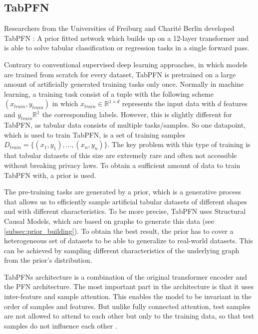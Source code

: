 \subsection{TabPFN}
Researchers from the Universities of Freiburg and Charité Berlin developed TabPFN \citep{hollmann2022tabpfn}: A prior fitted network which builds up on a 12-layer transformer and is able to solve tabular classification or regression tasks in a single forward pass.

Contrary to conventional supervised deep learning approaches, in which models are trained from scratch for every dataset, TabPFN is pretrained on a large amount of artificially generated training tasks only once.
Normally in machine learning, a training task consist of a tuple with the following scheme $(x_{train}, y_{train})$ in which $x_{train}  \in \mathbb{R}^{1 \times d}$ represents the input data with $d$ features and $y_{train} \mathbb{R}^{1}$ the corresponding labels.
However, this is slightly different for TabPFN, as tabular data consists of multiple tasks/samples.
So one datapoint, which is used to train TabPFN, is a set of training samples $D_{train} = \{(x_1, y_1), …, (x_n, y_n)\}$.
\newline
The key problem with this type of training is that tabular datasets of this size are extremely rare and often not accessible without breaking privacy laws.
To obtain a sufficient amount of data to train TabPFN with, a prior is used.

The pre-training tasks are generated by a prior, which is a generative process that allows us to efficiently sample artificial tabular datasets of different shapes and with different characteristics.
To be more precise, TabPFN uses Structural Causal Models, which are based on graphs to generate this data (see \autoref{subsec:prior_building}).
To obtain the best result, the prior has to cover a heterogeneous set of datasets to be able to generalize to real-world datasets.
This can be achieved by sampling different characteristics of the underlying graph from the prior’s distribution.

TabPFNs architecture is a combination of the original transformer encoder and the PFN architecture.
The most important part in the architecture is that it uses inter-feature and sample attention.
This enables the model to be invariant in the order of samples and features.
But unlike fully connected attention, test samples are not allowed to attend to each other but only to the training data, so that test samples do not influence each other \citep{hollmann2025accurate}.

